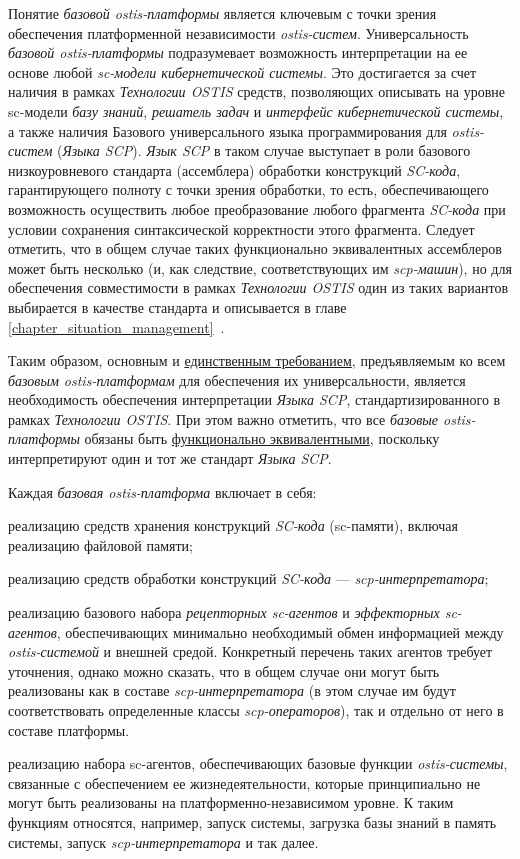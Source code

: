 Понятие \textit{базовой ostis-платформы} является ключевым с точки зрения обеспечения платформенной независимости \textit{ostis-систем}. Универсальность \textit{базовой ostis-платформы} подразумевает возможность интерпретации на ее основе любой \textit{sc-модели кибернетической системы}. Это достигается за счет наличия в рамках \textit{Технологии OSTIS} средств, позволяющих описывать на уровне sc-модели \textit{базу знаний}, \textit{решатель задач} и \textit{интерфейс кибернетической системы}, а также наличия Базового универсального языка программирования для \textit{ostis-систем} (\textit{Языка SCP}). \textit{Язык SCP} в таком случае выступает в роли базового низкоуровневого стандарта (ассемблера) обработки конструкций \textit{SC-кода}, гарантирующего полноту с точки зрения обработки, то есть, обеспечивающего возможность осуществить любое преобразование любого фрагмента \textit{SC-кода} при условии сохранения синтаксической корректности этого фрагмента. Следует отметить, что в общем случае таких функционально эквивалентных ассемблеров может быть несколько (и, как следствие, соответствующих им \textit{scp-машин}), но для обеспечения совместимости в рамках \textit{Технологии OSTIS} один из таких вариантов выбирается в качестве стандарта и описывается в главе \ref{chapter_situation_management}~. 

Таким образом, основным и \uline{единственным требованием}, предъявляемым ко всем \textit{базовым ostis-платформам} для обеспечения их универсальности, является необходимость обеспечения интерпретации \textit{Языка SCP}, стандартизированного в рамках \textit{Технологии OSTIS}. При этом важно отметить, что все \textit{базовые ostis-платформы} обязаны быть \uline{функционально эквивалентными}, поскольку интерпретируют один и тот же стандарт \textit{Языка SCP}.

Каждая \textit{базовая ostis-платформа} включает в себя:
\begin{textitemize}
	\item реализацию средств хранения конструкций \textit{SC-кода} (sc-памяти), включая реализацию файловой памяти;
	\item реализацию средств обработки конструкций \textit{SC-кода} --- \textit{scp-интерпретатора};
	\item реализацию базового набора \textit{рецепторных sc-агентов} и \textit{эффекторных sc-агентов}, обеспечивающих минимально необходимый обмен информацией между \textit{ostis-системой} и внешней средой. Конкретный перечень таких агентов требует уточнения, однако можно сказать, что в общем случае они могут быть реализованы как в составе \textit{scp-интерпретатора} (в этом случае им будут соответствовать определенные классы \textit{scp-операторов}), так и отдельно от него в составе платформы.
	\item реализацию набора sc-агентов, обеспечивающих базовые функции \textit{ostis-системы}, связанные с обеспечением ее жизнедеятельности, которые принципиально не могут быть реализованы на платформенно-независимом уровне. К таким функциям относятся, например, запуск системы, загрузка базы знаний в память системы, запуск \textit{scp-интерпретатора} и так далее.
\end{textitemize}

